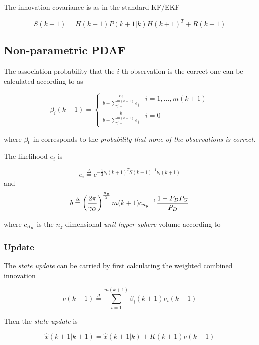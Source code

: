The innovation covariance is as in the standard KF/EKF

\begin{equation}
S(k+1) = H(k+1)P(k+1|k)H(k+1)^T + R(k+1)
\end{equation}


\subsection{Non-parametric PDAF}


The association probability that the $i$-th observation is the correct one can be calculated according to \cite{Kirubarajan2004} as

\begin{equation}\label{eq:betas}
\beta_i(k+1)=
\left\{\begin{array}{ll}
\frac{e_i}{b+\sum_{j=1}^{m(k+1)}e_j}  & i = 1,...,m(k+1) \\
\frac{b}{b+\sum_{j=1}^{m(k+1)}e_j} & i=0
\end{array}
\right.
\end{equation}


where $\beta_0$ in  corresponds to the \emph{probability that none of the observations is correct}.

The likelihood $e_i$ is

$$
e_i \overset{\Delta}{=}  e^{-\frac{1}{2} \nu_i(k+1)^T S(k+1)^{-1} \nu_i(k+1)}
$$
and 
$$
b \overset{\Delta}{=} \left(\frac{2\pi}{{\gamma_G}}\right)^{\frac{n_{y}}{2}}m(k+1){c_{n_{y}}}^{-1}\frac{1-P_D P_G}{P_D}
$$

where $c_{n_{y}}$ is the $n_z$-dimensional \emph{unit hyper-sphere} volume according to 

\subsubsection{Update}


The \emph{state update} can be carried by first calculating the weighted combined innovation



\begin{equation}\label{eq:weighted_innovation}
\nu(k+1) \overset{\Delta}{=} \sum_{i=1}^{m(k+1)}\beta_i(k+1)\nu_i(k+1)
\end{equation}


Then the \emph{state update} is

$$
\hat{x}(k+1|k+1) = \hat{x}(k+1|k) + K(k+1)\nu(k+1)
$$

